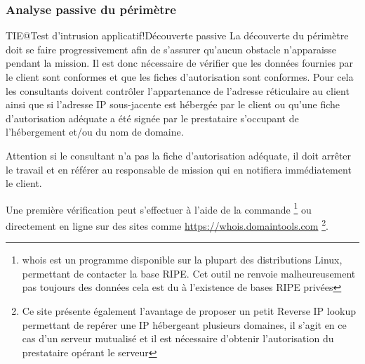 \documentclass[twoside,a4paper,12pt,titlepage]{book}
\begin{document}
\subsubsection{Analyse passive du périmètre}
\begin{Define}{TIE@Test d'intrusion applicatif!Découverte passive} La découverte du périmètre doit se faire progressivement afin de s'assurer qu'aucun obstacle n'apparaisse pendant la mission. Il est donc nécessaire de vérifier que les données fournies par le client sont conformes et que les fiches d'autorisation sont conformes. Pour cela les consultants doivent contrôler l'appartenance de l'adresse réticulaire au client ainsi que si l'adresse IP sous-jacente est hébergée par le client ou qu'une fiche d'autorisation adéquate a été signée par le prestataire s'occupant de l'hébergement et/ou du nom de domaine.\end{Define}
\begin{Stop} Attention si le consultant n'a pas la fiche d'autorisation adéquate, il doit arrêter le travail et en référer au responsable de mission qui en notifiera immédiatement le client.\end{Stop}
	Une première vérification peut s'effectuer à l'aide de la commande \footnote{whois est un programme disponible sur la plupart des distributions Linux, permettant de contacter la base RIPE. Cet outil ne renvoie malheureusement pas toujours des données cela est du à l'existence de bases RIPE privées} ou directement en ligne sur des sites comme \url{https://whois.domaintools.com} \footnote{Ce site présente également l'avantage de proposer un petit Reverse IP lookup permettant de repérer une IP hébergeant plusieurs domaines, il s'agit en ce cas d'un serveur mutualisé et il est nécessaire d'obtenir l'autorisation du prestataire opérant le serveur}.\\
\end{document}
